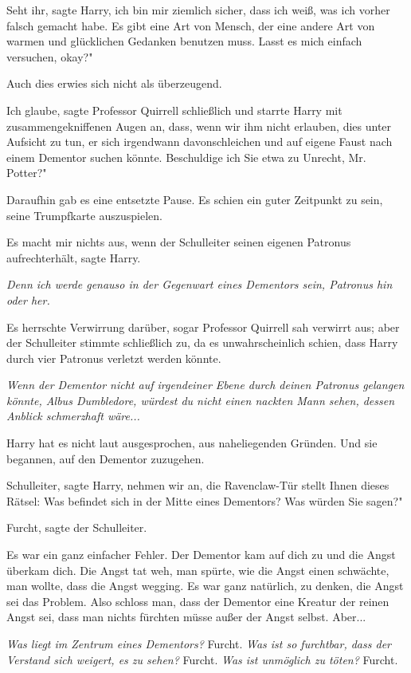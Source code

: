 \glqq Seht ihr\grqq{}, sagte Harry, \glqq ich bin mir ziemlich sicher, dass ich
weiß, was ich vorher falsch gemacht habe. Es gibt eine Art von Mensch, der eine
andere Art von warmen und glücklichen Gedanken benutzen muss. Lasst es mich
einfach versuchen, okay?"

Auch dies erwies sich nicht als überzeugend.

\glqq Ich glaube\grqq{}, sagte Professor Quirrell schließlich und starrte Harry
mit zusammengekniffenen Augen an, \glqq dass, wenn wir ihm nicht erlauben, dies
unter Aufsicht zu tun, er sich irgendwann davonschleichen und auf eigene Faust
nach einem Dementor suchen könnte. Beschuldige ich Sie etwa zu Unrecht, Mr.
Potter?"

Daraufhin gab es eine entsetzte Pause. Es schien ein guter Zeitpunkt zu sein,
seine Trumpfkarte auszuspielen.

\glqq Es macht mir nichts aus, wenn der Schulleiter seinen eigenen Patronus
aufrechterhält\grqq{}, sagte Harry.

\emph{Denn ich werde genauso in der Gegenwart eines Dementors sein, Patronus
hin oder her.}

Es herrschte Verwirrung darüber, sogar Professor Quirrell sah verwirrt aus; aber
der Schulleiter stimmte schließlich zu, da es unwahrscheinlich schien, dass
Harry durch vier Patronus verletzt werden könnte.

\emph{Wenn der Dementor nicht auf irgendeiner Ebene durch deinen Patronus
gelangen könnte, Albus Dumbledore, würdest du nicht einen nackten Mann sehen,
dessen Anblick schmerzhaft wäre...}

Harry hat es nicht laut ausgesprochen, aus naheliegenden Gründen. Und sie
begannen, auf den Dementor zuzugehen.

\glqq Schulleiter\grqq{}, sagte Harry, \glqq nehmen wir an, die Ravenclaw-Tür
stellt Ihnen dieses Rätsel: Was befindet sich in der Mitte eines Dementors? Was
würden Sie sagen?"

\glqq Furcht\grqq{}, sagte der Schulleiter.

Es war ein ganz einfacher Fehler. Der Dementor kam auf dich zu und die Angst
überkam dich. Die Angst tat weh, man spürte, wie die Angst einen schwächte, man
wollte, dass die Angst wegging. Es war ganz natürlich, zu denken, die Angst sei
das Problem. Also schloss man, dass der Dementor eine Kreatur der reinen Angst
sei, dass man nichts fürchten müsse außer der Angst selbst. Aber...

\emph{Was liegt im Zentrum eines Dementors?}
Furcht.
\emph{Was ist so furchtbar, dass der Verstand sich weigert, es zu sehen?}
Furcht.
\emph{Was ist unmöglich zu töten?}
Furcht.

